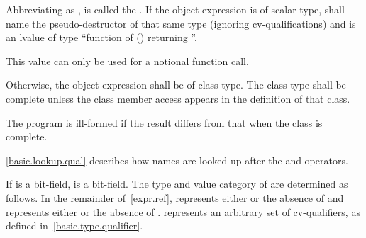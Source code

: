 \pnum
Abbreviating
as ,  is called the .
If the object expression is of scalar type,
 shall name the pseudo-destructor
of that same type (ignoring cv-qualifications) and
 is an lvalue of type ``function of () returning ''.
\begin{note}
This value can only be used
for a notional function call.
\end{note}

\pnum
Otherwise, the object expression shall be of class type.
The class type shall be complete
unless the class member access appears in the definition of that class.
\begin{note}
The program is ill-formed if the result differs from that
when the class is complete.
\end{note}
\begin{note}
\ref{basic.lookup.qual} describes how names are looked up after the
 and \tcode{->} operators.
\end{note}

\pnum
If  is a bit-field,  is a bit-field. The
type and value category of  are determined as follows.
In the remainder of~\ref{expr.ref},  represents either
 or the absence of  and  represents
either  or the absence of . 
represents an arbitrary set of cv-qualifiers, as defined
in~\ref{basic.type.qualifier}.

